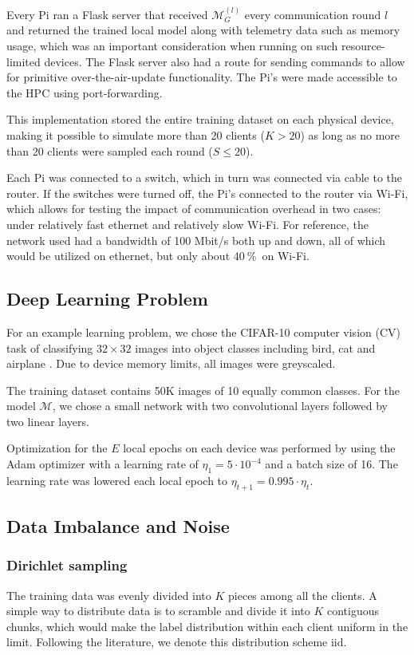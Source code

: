 \documentclass{article}
\newcommand{\unit}[1]{\ensuremath{\:\text{#1}}}
\newcommand{\pro}{\ensuremath{\unit{\%{}}}}
\begin{document}
Every Pi ran a Flask server that received $\mathcal M_G^{(l)}$ every communication round $l$ and returned the trained local model along with telemetry data such as memory usage, which was an important consideration when running on such resource-limited devices.
The Flask server also had a route for sending commands to allow for primitive over-the-air-update functionality.
The Pi's were made accessible to the HPC using port-forwarding.

This implementation stored the entire training dataset on each physical device, making it possible to simulate more than 20 clients ($K > 20$) as long as no more than 20 clients were sampled each round ($S \leq 20$).

Each Pi was connected to a switch, which in turn was connected via cable to the router.
If the switches were turned off, the Pi's connected to the router via Wi-Fi, which allows for testing the impact of communication overhead in two cases: under relatively fast ethernet and relatively slow Wi-Fi.
For reference, the network used had a bandwidth of 100 Mbit/s both up and down, all of which would be utilized on ethernet, but only about 40\pro\ on Wi-Fi.

\subsection{Deep Learning Problem}
For an example learning problem, we chose the CIFAR-10 computer vision (CV) task of classifying $32\times 32$ images into object classes including bird, cat and airplane \cite{alex2009learning}.
Due to device memory limits, all images were greyscaled.

The training dataset contains 50K images of 10 equally common classes.
For the model $\mathcal M$, we chose a small network with two convolutional layers followed by two linear layers.

Optimization for the $E$ local epochs on each device was performed by using the Adam optimizer \cite{kingma2015adam} with a learning rate of $\eta_1 = 5\cdot 10^{-4}$ and a batch size of 16.
The learning rate was lowered each local epoch to $\eta_{t+1} = 0.995\cdot \eta_{t}$.

\subsection{Data Imbalance and Noise}
\subsubsection{Dirichlet sampling}
The training data was evenly divided into $K$ pieces among all the clients.
A simple way to distribute data is to scramble and divide it into $K$ contiguous chunks, which would make the label distribution within each client uniform in the limit.
Following the literature, we denote this distribution scheme iid. \cite{lin2020ensemble}
\end{document}
